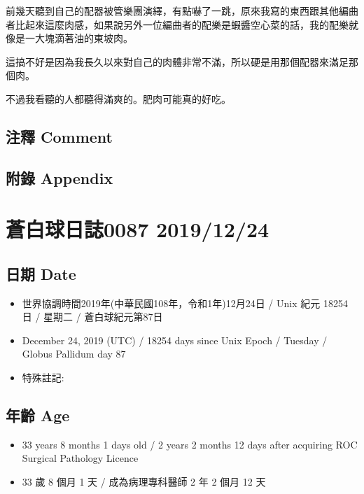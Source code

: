 \documentclass[a5paper, 12pt
]{book}
\providecommand{\tightlist}{%
  \setlength{\itemsep}{0pt}\setlength{\parskip}{0pt}}
\begin{document}
前幾天聽到自己的配器被管樂團演繹，有點嚇了一跳，原來我寫的東西跟其他編曲者比起來這麼肉感，如果說另外一位編曲者的配樂是蝦醬空心菜的話，我的配樂就像是一大塊滴著油的東坡肉。

這搞不好是因為我長久以來對自己的肉體非常不滿，所以硬是用那個配器來滿足那個肉。

不過我看聽的人都聽得滿爽的。肥肉可能真的好吃。

\hypertarget{ux6ce8ux91cb-comment-21}{%
\subsection{注釋 Comment}\label{ux6ce8ux91cb-comment-21}}

\hypertarget{ux9644ux9304-appendix-22}{%
\subsection{附錄 Appendix}\label{ux9644ux9304-appendix-22}}

\hypertarget{ux84bcux767dux7403ux65e5ux8a8c0087-20191224}{%
\section{蒼白球日誌0087
2019/12/24}\label{ux84bcux767dux7403ux65e5ux8a8c0087-20191224}}

\hypertarget{ux65e5ux671f-date-23}{%
\subsection{日期 Date}\label{ux65e5ux671f-date-23}}

\begin{itemize}
\tightlist
\item
  世界協調時間2019年(中華民國108年，令和1年)12月24日 / Unix 紀元 18254
  日 / 星期二 / 蒼白球紀元第87日
\item
  December 24, 2019 (UTC) / 18254 days since Unix Epoch / Tuesday /
  Globus Pallidum day 87
\item
  特殊註記:
\end{itemize}

\hypertarget{ux5e74ux9f61-age-23}{%
\subsection{年齡 Age}\label{ux5e74ux9f61-age-23}}

\begin{itemize}
\tightlist
\item
  33 years 8 months 1 days old / 2 years 2 months 12 days after
  acquiring ROC Surgical Pathology Licence
\item
  33 歲 8 個月 1 天 / 成為病理專科醫師 2 年 2 個月 12 天
\end{itemize}
\end{document}
